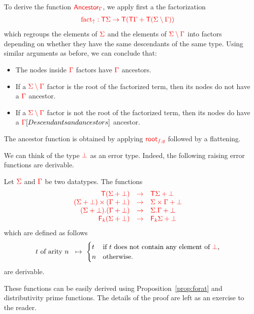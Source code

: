 \begin{example}
\smallskip
To derive the function ${\color{red}{\mathsf{Ancestor}_\Gamma}}$, we apply first a the factorization
\begin{align*}
{\color{red}{{\color{red}{\mathrm{fact_{\uparrow}}}}: {\color{red}{\mathsf T}}{\color{red}{\Sigma}}\to {\color{red}{\mathsf T}}({\color{red}{\mathsf T}}{\color{red}{\Gamma}}+{\color{red}{\mathsf T}}({\color{red}{\Sigma}}\setminus{\color{red}{\Gamma}}))}}
\end{align*} which regroups the elements of ${\color{red}{\Sigma}}$ and the elements of ${\color{red}{{\color{red}{\Sigma}}\setminus{\color{red}{\Gamma}}}}$ into factors depending on whether they have the same descendants of the same type. 
Using similar arguments as before, we can conclude that:
\begin{itemize}
\item The nodes inside ${\color{red}{\Gamma}}$ factors have ${\color{red}{\Gamma}}$ ancestors.  
\item If a ${\color{red}{{\color{red}{\Sigma}}\setminus{\color{red}{\Gamma}}}}$ factor is the root of the factorized term, then its nodes do not have a ${\color{red}{\Gamma}}$ ancestor.
\item   If a ${\color{red}{{\color{red}{\Sigma}}\setminus{\color{red}{\Gamma}}}}$ factor is not the root of the factorized term, then its nodes do have a ${\color{red}{\Gamma}}[Descendants and ancestors]\label{ex:descendant}$ ancestor.
\end{itemize}
The ancestor function is obtained by applying ${\color{red}{\mathsf{root}_{f,g}}}$ followed by a flattening.
\end{example}

\begin{example}\label{ex:error-raising}
We can think of the type ${\color{red}{\bot}}$ as an error type. Indeed, the following raising error functions are derivable.
\begin{lemma}\label{lem:error-raising}
Let ${\color{red}{\Sigma}}$ and ${\color{red}{\Gamma}}$ be two datatypes. The functions
$$\begin{array}{rll}
{\color{red}{{\color{red}{\mathsf T}}(\Sigma+\bot)}} &{\color{red}{\to }}&{\color{red}{{\color{red}{\mathsf T}}\Sigma +\bot}}\\
{\color{red}{(\Sigma+\bot) \times(\Gamma+\bot)}} &{\color{red}{\to}} &{\color{red}{\Sigma\times\Gamma+\bot }}\\
{\color{red}{{\color{red}{(\Sigma+\bot) . (\Gamma+\bot)}}}} &{\color{red}{\to}} &{\color{red}{{\color{red}{\Sigma . \Gamma}} +\bot}}\\
{\color{red}{{\color{red}{\mathsf F_{k}}}(\Sigma+\bot)}} &{\color{red}{\to}} &{\color{red}{{\color{red}{\mathsf F_{k}}}\Sigma +\bot}} 
\end{array}$$
which are defined as follows
\begin{align*}
 t \text{ of arity } n \ \ \mapsto \  \begin{cases}
    t & 
    \text{if $t$ does not contain any element of ${\color{red}{\bot}}$,}\\
    n & \text{otherwise.}
\end{cases}
\end{align*} are derivable.
\end{lemma}
These functions can be easily derived using Proposition~\ref{prop:forat} and distributivity prime functions. The details of the proof are left as an exercise to the reader.
\end{example}

